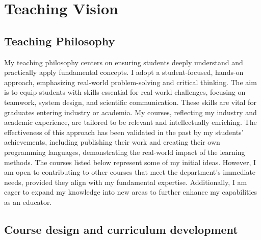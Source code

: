 \documentclass[12pt,a4paper,sans]{moderncv}
\begin{document}
\section*{Teaching Vision}

\subsection*{Teaching Philosophy}

My teaching philosophy centers on ensuring students deeply understand and practically apply fundamental concepts. I adopt a student-focused, hands-on approach, emphasizing real-world problem-solving and critical thinking. The aim is to equip students with skills essential for real-world challenges, focusing on teamwork, system design, and scientific communication. These skills are vital for graduates entering industry or academia. My courses, reflecting my industry and academic experience, are tailored to be relevant and intellectually enriching. The effectiveness of this approach has been validated in the past by my students' achievements, including publishing their work and creating their own programming languages, demonstrating the real-world impact of the learning methods. The courses listed below represent some of my initial ideas. However, I am open to contributing to other courses that meet the department's immediate needs, provided they align with my fundamental expertise. Additionally, I am eager to expand my knowledge into new areas to further enhance my capabilities as an educator.

\subsection*{Course design and curriculum development}
\end{document}
